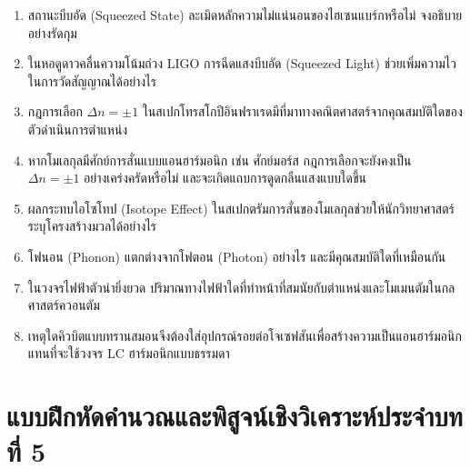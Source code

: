 \begin{enumerate}
    \item สถานะบีบอัด (Squeezed State) ละเมิดหลักความไม่แน่นอนของไฮเซนแบร์กหรือไม่ จงอธิบายอย่างรัดกุม
    \item ในหอดูดาวคลื่นความโน้มถ่วง LIGO การฉีดแสงบีบอัด (Squeezed Light) ช่วยเพิ่มความไวในการวัดสัญญาณได้อย่างไร
    \item กฎการเลือก $\Delta n = \pm 1$ ในสเปกโทรสโกปีอินฟราเรดมีที่มาทางคณิตศาสตร์จากคุณสมบัติใดของตัวดำเนินการตำแหน่ง
    \item หากโมเลกุลมีศักย์การสั่นแบบแอนฮาร์มอนิก เช่น ศักย์มอร์ส กฎการเลือกจะยังคงเป็น $\Delta n = \pm 1$ อย่างเคร่งครัดหรือไม่ และจะเกิดแถบการดูดกลืนแสงแบบใดขึ้น
    \item ผลกระทบไอโซโทป (Isotope Effect) ในสเปกตรัมการสั่นของโมเลกุลช่วยให้นักวิทยาศาสตร์ระบุโครงสร้างมวลได้อย่างไร
    \item โฟนอน (Phonon) แตกต่างจากโฟตอน (Photon) อย่างไร และมีคุณสมบัติใดที่เหมือนกัน
    \item ในวงจรไฟฟ้าตัวนำยิ่งยวด ปริมาณทางไฟฟ้าใดที่ทำหน้าที่สมนัยกับตำแหน่งและโมเมนตัมในกลศาสตร์ควอนตัม
    \item เหตุใดคิวบิตแบบทรานสมอนจึงต้องใส่อุปกรณ์รอยต่อโจเซฟสันเพื่อสร้างความเป็นแอนฮาร์มอนิก แทนที่จะใช้วงจร LC ฮาร์มอนิกแบบธรรมดา
\end{enumerate}

\section{แบบฝึกหัดคำนวณและพิสูจน์เชิงวิเคราะห์ประจำบทที่ 5}
\label{sec_analytical_problems_ch05}

